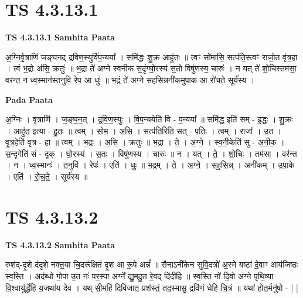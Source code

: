\documentclass[17pt]{extarticle}
\begin{document}
\section*{ TS 4.3.13.1 }

\textbf{TS 4.3.13.1 } \newline
\textbf{Samhita Paata} \newline

अ॒ग्निर्वृ॒त्राणि॑ जङ्घनद् द्रविण॒स्युर्वि॑प॒न्यया᳚ । समि॑द्धः शु॒क्र आहु॑तः ॥ त्वꣳ सो॑मासि॒ सत्प॑ति॒स्त्वꣳ राजो॒त वृ॑त्र॒हा । त्वं भ॒द्रो अ॑सि॒ क्रतुः॑ ॥ भ॒द्रा ते॑ अग्ने स्वनीक स॒दृंग्घो॒रस्य॑ स॒तो विषु॑णस्य॒ चारुः॑ । न यत् ते॑ शो॒चिस्तम॑सा॒ वर॑न्त॒ न ध्व॒स्मान॑स्त॒नुवि॒ रेप॒ आ धुः॑ ॥ भ॒द्रं ते॑ अग्ने सहसि॒न्ननी॑कमुपा॒क आ रो॑चते॒ सूर्य॑स्य । \newline

\textbf{Pada Paata} \newline

अ॒ग्निः । वृ॒त्राणि॑ । ज॒ङ्घ॒न॒त् । द्र॒वि॒ण॒स्युः । वि॒प॒न्ययेति॑ वि - प॒न्यया᳚ ॥ समि॑द्ध॒ इति॑ सम् - इ॒द्धः॒ । शु॒क्रः । आहु॑त॒ इत्या - हु॒तः॒ ॥ त्वम् । सो॒म॒ । अ॒सि॒ । सत्प॑ति॒रिति॒ सत् - प॒तिः॒ । त्वम् । राजा᳚ । उ॒त । वृ॒त्र॒हेति॑ वृत्र - हा ॥ त्वम् । भ॒द्रः । अ॒सि॒ । क्रतुः॑ ॥ भ॒द्रा । ते॒ । अ॒ग्ने॒ । स्व॒नी॒केति॑ सु - अ॒नी॒क॒ । स॒न्दृगेति॑ सं - दृक् । घो॒रस्य॑ । स॒तः । विषु॑णस्य । चारुः॑ ॥ न । यत् । ते॒ । शो॒चिः । तम॑सा । वर॑न्त । न । ध्व॒स्मानः॑ । त॒नुवि॑ । रेपः॑ । एति॑ । धुः॒ ॥ भ॒द्रम् । ते॒ । अ॒ग्ने॒ । स॒ह॒सि॒न्न् । अनी॑कम् । उ॒पा॒के । एति॑ । रो॒च॒ते॒ । सूर्य॑स्य ॥  \newline




\section*{ TS 4.3.13.2 }

\textbf{TS 4.3.13.2 } \newline
\textbf{Samhita Paata} \newline

रुश॑द्-दृ॒शे द॑दृशे नक्त॒या चि॒दरू᳚क्षितं दृ॒श आ रू॒पे अन्नं᳚ ॥ सैनाऽनी॑केन सुवि॒दत्रो॑ अ॒स्मे यष्टा॑ दे॒वाꣳ आय॑जिष्ठः स्व॒स्ति । अद॑ब्धो गो॒पा उ॒त नः॑ पर॒स्पा अग्ने᳚ द्यु॒मदु॒त रे॒वद् दि॑दीहि ॥ स्व॒स्ति नो॑ दि॒वो अ॑ग्ने पृथि॒व्या वि॒श्वायु॑र्द्धेहि य॒जथा॑य देव । यथ् सी॒महि॑ दिविजात॒ प्रश॑स्तं॒ तद॒स्मासु॒ द्रवि॑णं धेहि चि॒त्रं ॥ यथा॑ होत॒र्मनु॑षो - [  ] \newline
\end{document}
